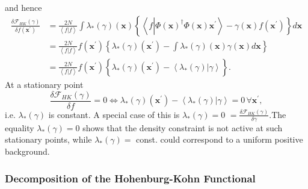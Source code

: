 \documentclass[aps,preprint]{revtex4}%
\begin{document}
and hence
\begin{align}
\frac{\delta\mathcal{F}_{HK}\left(  \gamma\right)  }{\delta f\left(
\mathbf{x}^{\prime}\right)  }  &  =\frac{2N}{\left\langle f|f\right\rangle
}\int\lambda_{\ast}\left(  \gamma\right)  \left(  \mathbf{x}\right)  \left\{
\left\langle f\left\vert \overset{}{\Phi\left(  \mathbf{x}\right)  ^{\dagger
}\Phi\left(  \mathbf{x}\right)  }\right.  \mathbf{x}^{\prime}\right\rangle
-\gamma\left(  \mathbf{x}\right)  f\left(  \mathbf{x}^{\prime}\right)
\right\}  d\mathbf{x}\nonumber\\
&  =\frac{2N}{\left\langle f|f\right\rangle }f\left(  \mathbf{x}^{\prime
}\right)  \left\{  \lambda_{\ast}\left(  \gamma\right)  \left(  \mathbf{x}%
^{\prime}\right)  -\int\lambda_{\ast}\left(  \gamma\right)  \left(
\mathbf{x}\right)  \gamma\left(  \mathbf{x}\right)  d\mathbf{x}\right\}
\nonumber\\
&  =\frac{2N}{\left\langle f|f\right\rangle }f\left(  \mathbf{x}^{\prime
}\right)  \left\{  \overset{}{\lambda_{\ast}\left(  \gamma\right)  \left(
\mathbf{x}^{\prime}\right)  -\left\langle \left.  \lambda_{\ast}\left(
\gamma\right)  \right\vert \gamma\right\rangle }\right\}  .
\end{align}
At a stationary point
\begin{equation}
\frac{\delta\mathcal{F}_{HK}\left(  \gamma\right)  }{\delta f}%
=0\Leftrightarrow\lambda_{\ast}\left(  \gamma\right)  \left(  \mathbf{x}%
^{\prime}\right)  -\left\langle \left.  \lambda_{\ast}\left(  \gamma\right)
\right\vert \gamma\right\rangle =0\,\forall\mathbf{x}^{\prime}, \label{Ustat}%
\end{equation}
i.e. $\lambda_{\ast}\left(  \gamma\right)  $ is constant. A special case of
this is $\lambda_{\ast}\left(  \gamma\right)  =0$ $=\frac{\delta
\mathcal{F}_{HK}\left(  \gamma\right)  }{\delta\gamma}.$The equality
$\lambda_{\ast}\left(  \gamma\right)  =0$ shows that the density constraint is
not active at such stationary points, while $\lambda_{\ast}\left(
\gamma\right)  =$ const. could correspond to a uniform positive background.

\subsubsection{Decomposition of the Hohenburg-Kohn Functional}
\end{document}
